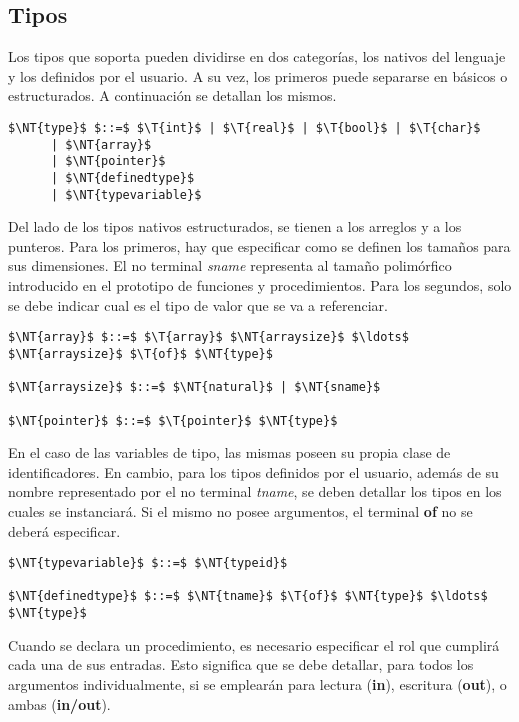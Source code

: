 \subsection{Tipos}

Los tipos que soporta \Lenguaje{} pueden dividirse en dos categorías, los nativos del lenguaje y los definidos por el usuario.
A su vez, los primeros puede separarse en básicos o estructurados.
A continuación se detallan los mismos.

\begin{lstlisting}[style = syntax]
$\NT{type}$ $::=$ $\T{int}$ | $\T{real}$ | $\T{bool}$ | $\T{char}$
      | $\NT{array}$
      | $\NT{pointer}$
      | $\NT{definedtype}$
      | $\NT{typevariable}$
\end{lstlisting}

Del lado de los tipos nativos estructurados, se tienen a los arreglos y a los punteros.
Para los primeros, hay que especificar como se definen los tamaños para sus dimensiones.
El no terminal \textit{sname} representa al tamaño polimórfico introducido en el prototipo de funciones y procedimientos.
Para los segundos, solo se debe indicar cual es el tipo de valor que se va a referenciar. 

\begin{lstlisting}[style = syntax]
$\NT{array}$ $::=$ $\T{array}$ $\NT{arraysize}$ $\ldots$ $\NT{arraysize}$ $\T{of}$ $\NT{type}$

$\NT{arraysize}$ $::=$ $\NT{natural}$ | $\NT{sname}$

$\NT{pointer}$ $::=$ $\T{pointer}$ $\NT{type}$
\end{lstlisting}

En el caso de las variables de tipo, las mismas poseen su propia clase de identificadores.
En cambio, para los tipos definidos por el usuario, además de su nombre representado por el no terminal \textit{tname}, se deben detallar los tipos en los cuales se instanciará.
Si el mismo no posee argumentos, el terminal \textbf{of} no se deberá especificar.

\begin{lstlisting}[style = syntax]
$\NT{typevariable}$ $::=$ $\NT{typeid}$

$\NT{definedtype}$ $::=$ $\NT{tname}$ $\T{of}$ $\NT{type}$ $\ldots$ $\NT{type}$
\end{lstlisting}

Cuando se declara un procedimiento, es necesario especificar el rol que cumplirá cada una de sus entradas.
Esto significa que se debe detallar, para todos los argumentos individualmente, si se emplearán para lectura (\textbf{in}), escritura (\textbf{out}), o ambas (\textbf{in/out}).

